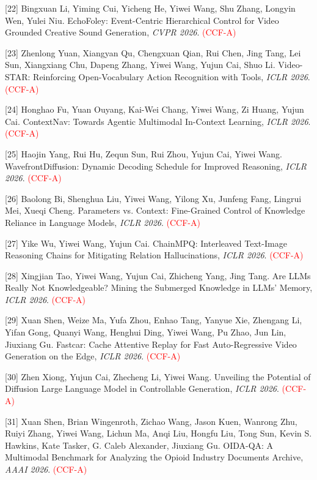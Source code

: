 [22] Bingxuan Li, Yiming Cui, Yicheng He, Yiwei Wang, Shu Zhang, Longyin Wen, Yulei Niu. EchoFoley: Event-Centric Hierarchical Control for Video Grounded Creative Sound Generation, \textit{CVPR 2026}. \textcolor{red}{(CCF-A)}

[23] Zhenlong Yuan, Xiangyan Qu, Chengxuan Qian, Rui Chen, Jing Tang, Lei Sun, Xiangxiang Chu, Dapeng Zhang, Yiwei Wang, Yujun Cai, Shuo Li. Video-STAR: Reinforcing Open-Vocabulary Action Recognition with Tools, \textit{ICLR 2026}. \textcolor{red}{(CCF-A)}

[24] Honghao Fu, Yuan Ouyang, Kai-Wei Chang, Yiwei Wang, Zi Huang, Yujun Cai. ContextNav: Towards Agentic Multimodal In-Context Learning, \textit{ICLR 2026}. \textcolor{red}{(CCF-A)}

[25] Haojin Yang, Rui Hu, Zequn Sun, Rui Zhou, Yujun Cai, Yiwei Wang. WavefrontDiffusion: Dynamic Decoding Schedule for Improved Reasoning, \textit{ICLR 2026}. \textcolor{red}{(CCF-A)}

[26] Baolong Bi, Shenghua Liu, Yiwei Wang, Yilong Xu, Junfeng Fang, Lingrui Mei, Xueqi Cheng. Parameters vs. Context: Fine-Grained Control of Knowledge Reliance in Language Models, \textit{ICLR 2026}. \textcolor{red}{(CCF-A)}

[27] Yike Wu, Yiwei Wang, Yujun Cai. ChainMPQ: Interleaved Text-Image Reasoning Chains for Mitigating Relation Hallucinations, \textit{ICLR 2026}. \textcolor{red}{(CCF-A)}

[28] Xingjian Tao, Yiwei Wang, Yujun Cai, Zhicheng Yang, Jing Tang. Are LLMs Really Not Knowledgeable? Mining the Submerged Knowledge in LLMs' Memory, \textit{ICLR 2026}. \textcolor{red}{(CCF-A)}

[29] Xuan Shen, Weize Ma, Yufa Zhou, Enhao Tang, Yanyue Xie, Zhengang Li, Yifan Gong, Quanyi Wang, Henghui Ding, Yiwei Wang, Pu Zhao, Jun Lin, Jiuxiang Gu. Fastcar: Cache Attentive Replay for Fast Auto-Regressive Video Generation on the Edge, \textit{ICLR 2026}. \textcolor{red}{(CCF-A)}

[30] Zhen Xiong, Yujun Cai, Zhecheng Li, Yiwei Wang. Unveiling the Potential of Diffusion Large Language Model in Controllable Generation, \textit{ICLR 2026}. \textcolor{red}{(CCF-A)}

[31] Xuan Shen, Brian Wingenroth, Zichao Wang, Jason Kuen, Wanrong Zhu, Ruiyi Zhang, Yiwei Wang, Lichun Ma, Anqi Liu, Hongfu Liu, Tong Sun, Kevin S. Hawkins, Kate Tasker, G. Caleb Alexander, Jiuxiang Gu. OIDA-QA: A Multimodal Benchmark for Analyzing the Opioid Industry Documents Archive, \textit{AAAI 2026}. \textcolor{red}{(CCF-A)}

